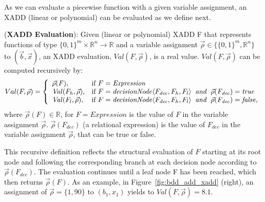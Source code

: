 \documentclass[twoside,11pt]{article}
\newenvironment{mydef}[1][Definition]{\begin{trivlist}
\item[\hskip \labelsep {\bfseries #1}]}{\end{trivlist}}
\begin{document}
As we can evaluate a piecewise function with a given variable assignment, an XADD (linear or polynomial) can be evaluated as we define next.

\begin{mydef}(\textbf{XADD Evaluation}):
Given (linear or polynomial) XADD F  that represents functions of type $\lbrace 0,1 \rbrace^m \times \mathbb{R}^{n} \rightarrow \mathbb{R}$ and a variable assignment $\vec{\rho} \in \lbrace \lbrace0,1 \rbrace^m,\mathbb{R}^n \rbrace$ to $(\vec{b},\vec{x})$, an XADD evaluation,  
$ Val(F,\vec{\rho})$, is a real value.  $ Val(F,\vec{\rho})$ can be computed recursively by:
\begin{equation*}
Val(F,\vec{\rho}) = \left\{
\begin{array}{lll}
\vec{\rho}(\mathit{F}),  &\textrm{if } F=\mathit{Expression}\\
\mathit{Val} (F_h,\vec{\rho}), &\textrm{if } F = \mathit{decisionNode} \langle F_{\mathit{dec}}, F_h, F_l \rangle \hspace{2mm}  \mathit{and} \hspace{2mm} \vec{\rho}(\mathit{F_{dec}})=\mathit{true}\\
 \mathit{Val} (F_l,\vec{\rho}), &\textrm{if } F = \mathit{decisionNode} \langle F_{\mathit{dec}}, F_h, F_l \rangle \hspace{2mm}  \mathit{and}  \hspace{2mm} \vec{\rho}(\mathit{F_{dec}})=\mathit{false},\\
\end{array} \right. 
\end{equation*}
where $\vec{\rho}(\mathit{F}) \in \mathbb{R}$, for $ F=\mathit{Expression}$ is the value of $F$ in the variable assignment $\vec{\rho}$. $\vec{\rho}(\mathit{F_{dec}})$  (a relational expression) is the value of $\mathit{F_{dec}}$  in the variable assignment $\vec{\rho}$, that can be true or false.


This recursive definition reflects the structural
evaluation of $F$ starting at its root node and following
the corresponding branch at each decision node according to $\vec{\rho}(F_\mathit{dec})$.
The evaluation continues until a leaf node F has been reached,
which then returns $\vec{\rho}(\mathit{F})$. As an example, in Figure~\ref{fig:bdd_add_xadd} (right), an assignment of $\vec{\rho} = \lbrace 1, 90\rbrace$ to $(b_1,x_1)$ yields to $Val(F,\vec{\rho})=8.1$.
\end{mydef}
\end{document}
